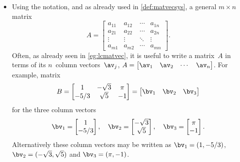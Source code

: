 \begin{itemize}
\item Using the  notation, and as already used in \cref{def:matvecsys}, a general \(m\times n\) matrix
\begin{equation*}
A=\begin{bmatrix}  a_{11}&a_{12}&\cdots&a_{1n}
\\a_{21}&a_{22}&\cdots&a_{2n}
\\\vdots&\vdots&\ddots&\vdots
\\a_{m1}&a_{m2}&\cdots&a_{mn} \end{bmatrix}.
\end{equation*}
Often, as already seen in \cref{eg:lcmatvec}, it is useful to write a matrix~\(A\) in terms of its \(n\)~column vectors~\(\av_j\), \(A=\begin{bmatrix} \av_1&\av_2&\cdots&\av_n \end{bmatrix}\).
For example, matrix
\begin{equation*}
B=\begin{bmatrix}   1 & -\sqrt3 & \pi
\\ -5/3 & \sqrt5 & -1 \end{bmatrix}
=\begin{bmatrix} \bv_1&\bv_2&\bv_3 \end{bmatrix}
\end{equation*}
for the three column vectors
\begin{equation*}
\bv_1=\begin{bmatrix}   1 \\ -5/3 \end{bmatrix},\quad
\bv_2=\begin{bmatrix} -\sqrt3 \\ \sqrt5 \end{bmatrix},\quad
\bv_3=\begin{bmatrix} \pi \\ -1 \end{bmatrix}.
\end{equation*}
Alternatively these column vectors may be written as 
\(\bv_1=(  1,-5/3)\),
\(\bv_2=(-\sqrt3,\sqrt5)\) and
\(\bv_3=(\pi,-1)\).




\end{itemize}
